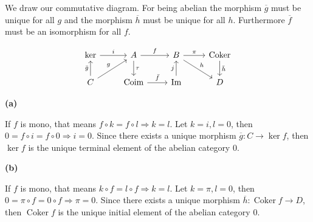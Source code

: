 \documentclass[leqno]{article}
\DeclareMathOperator{\coker}{Coker}
\begin{document}
We draw our commutative diagram. For being abelian the morphism $\overline{g}$ must be unique for all $g$ and the morphism $\overline{h}$ must be unique for all $h$. Furthermore $\overline{f}$ must be an isomorphism for all  $f$.

\[\begin{tikzcd}
	{\text{ker}} & A & B & {\text{Coker}} \\
	C & {\text{Coim}} & {\text{Im}} & D
	\arrow["i", from=1-1, to=1-2]
	\arrow["f", from=1-2, to=1-3]
	\arrow["\pi", from=1-3, to=1-4]
	\arrow["j", from=2-3, to=1-3]
	\arrow["\tau", from=1-2, to=2-2]
	\arrow["{\bar{f}}", from=2-2, to=2-3]
	\arrow["g", from=2-1, to=1-2]
	\arrow["{\bar{g}}", from=2-1, to=1-1]
	\arrow["h", from=1-3, to=2-4]
	\arrow["{\bar{h}}", from=1-4, to=2-4]
\end{tikzcd}\]

\textbf{(a)}

\fbox{$\Rightarrow$} If $f$ is mono, that means  $f\circ k =f\circ l \Rightarrow k=l$. Let $k = i, l = 0$, then $0=f\circ i=f\circ 0\Rightarrow i=0$. Since there exists a unique morphism $\overline{g}:C\to \ker f$, then $\ker f$ is the unique terminal element of the abelian category $0$.

\textbf{(b)}

\fbox{$\Rightarrow$} If $f$ is mono, that means  $k\circ f =l\circ f \Rightarrow k=l$. Let $k = \pi, l = 0$, then $0=\pi\circ f=0\circ f\Rightarrow \pi=0$. Since there exists a unique morphism $\overline{h}:\coker f\to D$, then $\coker f$ is the unique initial element of the abelian category $0$.
\end{document}
